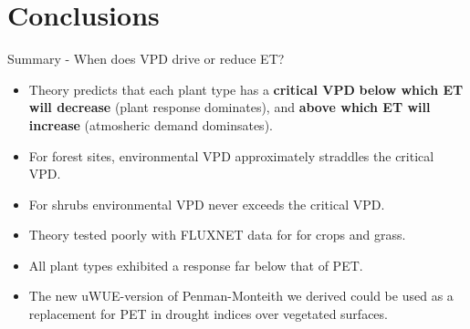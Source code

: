 \documentclass[aspectratio=169]{beamer}
\begin{document}
\section{Conclusions}


\begin{frame}{Summary - When does VPD drive or reduce ET?}
  \begin{itemize}
  \item Theory predicts that each plant type has a \textbf{critical VPD} \textbf{below which ET will decrease} (plant response dominates), and \textbf{above which ET will increase} (atmosheric demand dominsates).
  \item For forest sites, environmental VPD approximately straddles the critical VPD.
  \item For shrubs environmental VPD never exceeds the critical VPD.
  \item Theory tested poorly with FLUXNET data for for crops and grass. 
  \item All plant types exhibited a response far below that of PET.
  \item The new uWUE-version of Penman-Monteith we derived could be used as a replacement for PET in drought indices over vegetated surfaces.
  \end{itemize}
\end{frame}
\end{document}
